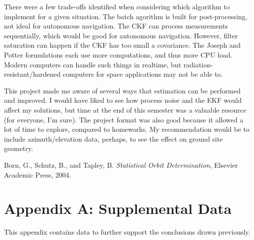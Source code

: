 \documentclass[]{aiaa-tc}%
\begin{document}
	\vspace{5 mm}

	There were a few trade-offs identified when considering which algorithm to implement for a given situation.  The batch agorithm is built for post-processing, not ideal for autonomous navigation.  The CKF can process measurements sequentially, which would be good for autonomous navigation.  However,  filter saturation can happen if the CKF has too small a covariance. The Joseph and Potter formulations each use more computations, and thus more CPU load.  Modern computers can handle such things in realtime, but radiation-resistant/hardened computers for space applications may not be able to. 
	
	\vspace{5 mm}

	This project made me aware of several ways that estimation can be performed and improved.  I would have liked to see how process noise and the EKF would affect my solutions, but time at the end of this semester was a valuable resource (for everyone, I'm sure).  The project format was also good because it allowed a lot of time to explore, compared to homeworks.  My recommendation would be to include azimuth/elevation data, perhaps, to see the effect on ground site geometry.
		
	
	\begin{thebibliography}{9}%
		\noindent Born, G., Schutz, B., and Tapley, B. \emph{Statistical Orbit Determination}, Elsevier Academic Press, 2004.
		
		
	\end{thebibliography}
	
	\newpage

	\section{Appendix A: Supplemental Data}
	\noindent This appendix contains data to further support the conclusions drawn previously.
\end{document}
